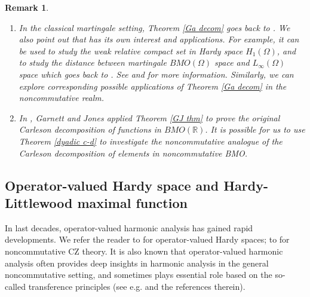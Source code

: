 \documentclass[11]{amsart}
\numberwithin{equation}{section}
\newtheorem{remark}[theorem]{Remark}
\begin{document}
\begin{remark}\label{cd Mei} 
	
	\begin{enumerate}[{\rm (i)}]
		\item 		
		In the classical martingale setting, Theorem \ref{Ga decom} goes back to \cite[Theorem II.4.1]{Ga1973}. We also point out that \cite[Theorem II.4.1]{Ga1973} has its own interest and applications.  For example, it can be used to study the weak relative compact set in Hardy space $H_1(\Omega)$, and to  study the distance between martingale $BMO(\Omega)$ space and $L_{\infty}(\Omega)$ space which goes back to \cite{GJ1978}. See \cite[Theorem 2.6.2]{Lo1993} and \cite[Chapter 4.6]{Lo1993} for more information. Similarly, we can explore corresponding possible applications of Theorem \ref{Ga decom} in the noncommutative realm.
		
		\item 	In \cite{GJ1978}, Garnett and Jones applied Theorem \ref{GJ thm} to prove the original Carleson decomposition \cite{Ca1976} of functions in $BMO(\mathbb{R})$. It is possible for us to use Theorem \ref{dyadic c-d} to investigate the noncommutative analogue of the Carleson decomposition of elements in noncommutative BMO. 
	\end{enumerate}
\end{remark}



\subsection{Operator-valued Hardy space and Hardy-Littlewood maximal function}\label{sec-Mei}
In last decades,  operator-valued harmonic analysis has gained rapid developments. We refer the reader to \cite{Me2007,XXX2016}  for operator-valued Hardy spaces; to \cite{CCP2022,Parcet2,HLX2023} for noncommutative CZ theory. It is also known that operator-valued  harmonic analysis often provides deep insights in harmonic analysis in the general noncommutative setting, and sometimes plays essential role based on the so-called transference principles (see e.g. \cite{CXY2013,HLW2021,XXX2016} and the references therein).
\end{document}
